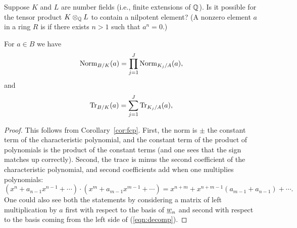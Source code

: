 \begin{exercise}\label{ex:normed6}
Suppose $K$ and $L$ are number fields (i.e., finite
extensions of $\mathbb{Q}$).  Is it possible for the tensor
product $K\otimes_{\mathbb{Q}} L$ to contain a nilpotent element? 
(A nonzero element $a$ in a ring $R$ is  if 
there exists $n>1$ such that $a^n=0$.)
\end{exercise}

\begin{corollary}
For $a\in B$ we have 
$$
 \operatorname{Norm}_{B/K}(a) = \prod_{j=1}^J \operatorname{Norm}_{K_j/A}(a),
$$
and 
$$
 \operatorname{Tr}_{B/K}(a) = \sum_{j=1}^J \operatorname{Tr}_{K_j/A}(a),
$$
\end{corollary}
\begin{proof}
  This follows from Corollary~\ref{cor:fcp}.  First, the norm is $\pm$
  the constant term of the characteristic polynomial, and the constant
  term of the product of polynomials is the product of the constant
  terms (and one sees that the sign matches up correctly).  Second,
  the trace is minus the second coefficient of the characteristic
  polynomial, and second coefficients add when one multiplies
  polynomials:
  $$
  (x^n + a_{n-1}x^{n-1} + \cdots ) \cdot (x^m + a_{m-1}x^{m-1} +
  \cdots ) = x^{n+m} + x^{n+m-1} (a_{m-1} + a_{n-1}) + \cdots.
  $$
  One could also see both the statements by considering a matrix of
  left multiplication by $a$ first with respect to the basis of
  $\underline{w}_n$ and second with respect to the basis coming from the left
  side of (\ref{eqn:decomp}).

\end{proof}




